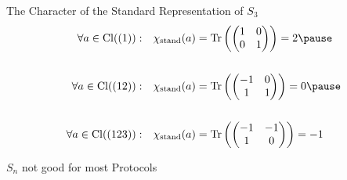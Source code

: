 \begin{frame}{The Character of the Standard Representation of $S_3$}
   \begin{align*}
    \forall a \in \Cl((1)): \quad & \chi_{\stand}(a) = \Tr\left(
        \begin{pmatrix}
            1 & 0 \\
            0 & 1
        \end{pmatrix}
    \right) = 2 \pause \\\\
    \forall a \in \Cl((12)): \quad & \chi_{\stand}(a) = \Tr\left(
        \begin{pmatrix}
            -1 & 0 \\
            1 & 1
        \end{pmatrix}
    \right) = 0 \pause \\\\
    \forall a \in \Cl((123)): \quad & \chi_{\stand}(a) = \Tr\left(
        \begin{pmatrix}
            -1 & -1 \\
            1 & 0
        \end{pmatrix}
    \right) = -1
   \end{align*} 
\end{frame}

\begin{frame}{$S_n$ not good for most Protocols}
\end{frame}

